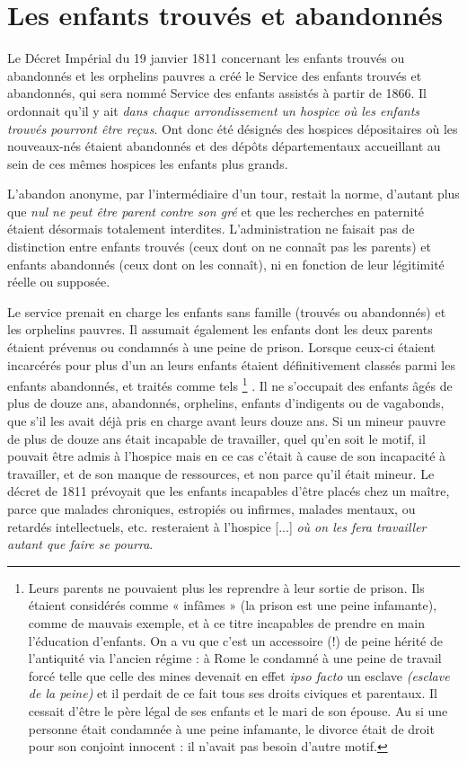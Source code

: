 

\section{Les enfants trouvés et abandonnés}

 Le Décret Impérial du 19 janvier 1811 concernant les enfants trouvés ou abandonnés et les orphelins pauvres a créé le Service des enfants trouvés et abandonnés, qui sera nommé Service des enfants assistés à partir de 1866. Il ordonnait qu'il y ait \emph{dans chaque arrondissement un hospice où les enfants trouvés pourront être reçus}. Ont donc été désignés des hospices dépositaires où les nouveaux-nés étaient abandonnés et des dépôts départementaux accueillant au sein de ces mêmes hospices les enfants plus grands. 

 L'abandon anonyme, par l'intermédiaire d'un tour, restait la norme, d'autant plus que \emph{nul ne peut être parent contre son gré} et que les recherches en paternité étaient désormais totalement interdites. L'administration ne faisait pas de distinction entre enfants trouvés (ceux dont on ne connaît pas les parents) et enfants abandonnés (ceux dont on les connaît), ni en fonction de leur légitimité réelle ou supposée.

 Le service prenait en charge les enfants sans famille (trouvés ou abandonnés) et les orphelins pauvres. Il assumait également les enfants dont les deux parents étaient prévenus ou condamnés à une peine de prison. Lorsque ceux-ci étaient incarcérés pour plus d'un an leurs enfants étaient définitivement classés parmi les enfants abandonnés, et traités comme tels%
\footnote{Leurs parents ne pouvaient plus les reprendre à leur sortie de prison. Ils étaient considérés comme « infâmes » (la prison est une peine infamante), comme de mauvais exemple, et à ce titre incapables de prendre en main l'éducation d'enfants. On a vu que c'est un accessoire (!) de peine hérité de l'antiquité via l'ancien régime : à Rome le condamné à une peine de travail forcé telle que celle des mines devenait en effet \emph{ipso facto} un esclave \emph{(esclave de la peine)} et il perdait de ce fait tous ses droits civiques et parentaux. Il cessait d'être le père légal de ses enfants et le mari de son épouse. Au  si une personne était condamnée à une peine infamante, le divorce était de droit pour son conjoint innocent : il n'avait pas besoin d'autre motif.}%
. Il ne s'occupait des enfants âgés de plus de douze ans, abandonnés, orphelins, enfants d'indigents ou de vagabonds, que s'il les avait déjà pris en charge avant leurs douze ans. Si un mineur pauvre de plus de douze ans était incapable de travailler, quel qu'en soit le motif, il pouvait être admis à l'hospice mais en ce cas c'était à cause de son incapacité à travailler, et de son manque de ressources, et non parce qu'il était mineur. Le décret de 1811 prévoyait que les enfants incapables d'être placés chez un maître, parce que malades chroniques, estropiés ou infirmes, malades mentaux, ou retardés intellectuels, etc. resteraient à l'hospice [...] \emph{où on les fera travailler autant que faire se pourra}.

